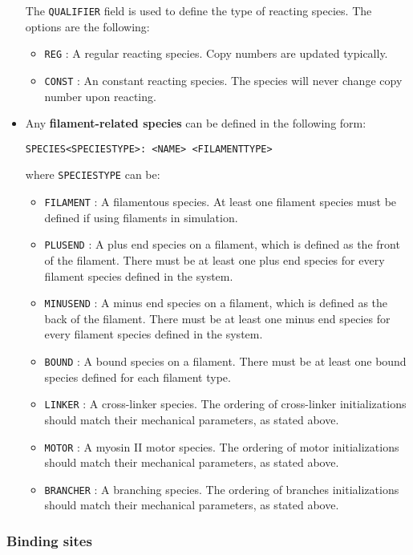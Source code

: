 \documentclass[11pt, oneside]{article}   	%
\begin{document}
\begin{itemize}
The \texttt{QUALIFIER} field is used to define the type of reacting species. The options are the following:
\begin{itemize}
\item \texttt{REG} : A regular reacting species. Copy numbers are updated typically.
\item \texttt{CONST} : An constant reacting species. The species will never change copy number upon reacting.
\end{itemize}

\item
Any \textbf{filament-related species} can be defined in the following form:\newline\newline\centerline{\texttt{SPECIES<SPECIESTYPE>: <NAME> <FILAMENTTYPE>}}\newline\newline where \texttt{SPECIESTYPE} can be:
\begin{itemize}
\item \texttt{FILAMENT} : A filamentous species. At least one filament species must be defined if using filaments in simulation.
\item \texttt{PLUSEND} : A plus end species on a filament, which is defined as the front of the filament. There must be at least one plus end species for every filament species defined in the system.
\item \texttt{MINUSEND} : A minus end species on a filament, which is defined as the back of the filament. There must be at least one minus end species for every filament species defined in the system.
\item \texttt{BOUND} : A bound species on a filament. There must be at least one bound species defined for each filament type. \item \texttt{LINKER} : A cross-linker species. The ordering of cross-linker initializations should match their mechanical parameters, as stated above.
\item \texttt{MOTOR} : A myosin II motor species. The ordering of motor initializations should match their mechanical parameters, as stated above.
\item \texttt{BRANCHER} : A branching species. The ordering of branches initializations should match their mechanical parameters, as stated above.
\end{itemize}

\end{itemize}

\subsubsection{Binding sites}
\end{document}
